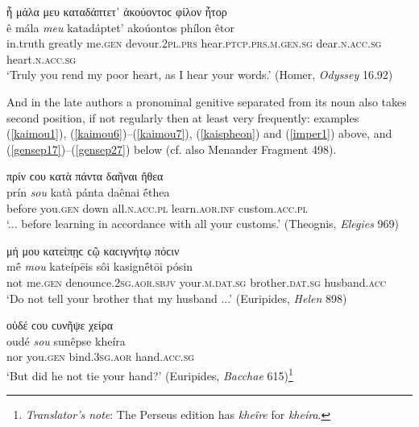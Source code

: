 \begin{exe}
\ex ἦ μάλα μευ καταδάπτετ᾽ ἀκούοντοϲ φίλον ἦτορ\\
\gll ê mála \emph{meu} katadáptet' akoúontos phílon êtor\\ 
in.truth greatly me.\textsc{gen} devour.\textsc{2pl.prs} hear.\textsc{ptcp.prs.m.gen.sg} dear.\textsc{n.acc.sg} heart.\textsc{n.acc.sg}\\
\trans `Truly you rend my poor heart, as I hear your words.' (Homer, \textit{Odyssey} 16.92)
\label{gensep16}
\end{exe}

And in the late authors a pronominal genitive separated from its noun also takes second position, if not regularly then at least very frequently: examples (\ref{kaimou1}), (\ref{kaimou6})--(\ref{kaimou7}), (\ref{kaispheon}) and (\ref{imper1}) above, and (\ref{gensep17})--(\ref{gensep27}) below (cf. also Menander Fragment 498).

\begin{exe}
\ex πρίν ϲου κατὰ πάντα δαῆναι ἤθεα\\
\gll prín \emph{sou} katà pánta daênai ḗthea\\
before you.\textsc{gen} down all.\textsc{n.acc.pl} learn.\textsc{aor.inf} custom.\textsc{acc.pl}\\
\trans `... before learning in accordance with all your customs.' (Theognis, \textit{Elegies} 969)
\label{gensep17}
\end{exe}

\begin{exe}
\ex μή μου κατείπῃϲ ϲῷ καϲιγνήτῳ πόϲιν\\
\gll mḗ \emph{mou} kateípēis sôi kasignḗtōi pósin\\
not me.\textsc{gen} denounce.\textsc{2sg.aor.sbjv} your.\textsc{m.dat.sg} brother.\textsc{dat.sg} husband.\textsc{acc}\\
\trans `Do not tell your brother that my husband ...' (Euripides, \textit{Helen} 898)
\label{gensep18}
\end{exe}

\begin{exe}
\ex οὐδέ ϲου ϲυνῆψε χείρα\\
\gll oudé \emph{sou} sunêpse kheíra\\
nor you.\textsc{gen} bind.\textsc{3sg.aor} hand.\textsc{acc.sg}\\
\trans `But did he not tie your hand?' (Euripides, \textit{Bacchae} 615)\footnote{\emph{Translator's note}: The Perseus edition has \textit{kheîre} for \textit{kheíra}.}
\label{gensep19}
\end{exe}

